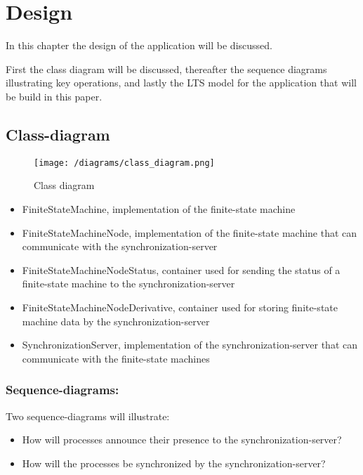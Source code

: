 \hypertarget{design}{%
\chapter{Design}\label{design}}

In this chapter the design of the application will be discussed.

First the class diagram will be discussed, thereafter the sequence
diagrams illustrating key operations, and lastly the LTS model for the
application that will be build in this paper.

\hypertarget{class-diagram}{%
\section{Class-diagram}\label{class-diagram}}

\begin{figure}
\centering
\texttt{[image: /diagrams/class\_diagram.png]}
\caption{Class diagram}
\end{figure}

\begin{itemize}
\tightlist
\item
  FiniteStateMachine, implementation of the finite-state machine
\item
  FiniteStateMachineNode, implementation of the finite-state machine
  that can communicate with the synchronization-server
\item
  FiniteStateMachineNodeStatus, container used for sending the status of
  a finite-state machine to the synchronization-server
\item
  FiniteStateMachineNodeDerivative, container used for storing
  finite-state machine data by the synchronization-server
\item
  SynchronizationServer, implementation of the synchronization-server
  that can communicate with the finite-state machines
\end{itemize}

\hypertarget{sequence-diagrams}{%
\subsection{Sequence-diagrams:}\label{sequence-diagrams}}

Two sequence-diagrams will illustrate:

\begin{itemize}
\tightlist
\item
  How will processes announce their presence to the
  synchronization-server?
\item
  How will the processes be synchronized by the synchronization-server?
\end{itemize}

